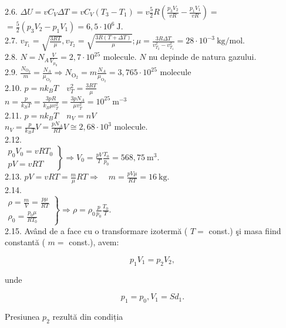 \documentclass[10pt]{article}
\begin{document}
2.6. $\Delta U=v C_{V} \Delta T=v C_{V}\left(T_{3}-T_{1}\right)=v \frac{5}{2} R\left(\frac{p_{3} V_{2}}{v R}-\frac{p_{1} V_{1}}{v R}\right)=$ $=\frac{5}{2}\left(p_{3} V_{2}-p_{1} V_{1}\right)=6,5 \cdot 10^{6} \mathrm{~J}$.\\
2.7. $v_{T_{1}}=\sqrt{\frac{3 R T}{\mu}}, v_{T_{2}}=\sqrt{\frac{3 R(T+\Delta T)}{\mu}} ; \mu=\frac{3 R \Delta T}{v_{T_{2}}^{2}-v_{T_{1}}^{2}}=28 \cdot 10^{-3} \mathrm{~kg} / \mathrm{mol}$.\\
2.8. $N=N_{A} \frac{V}{V_{\mu_{0}}}=2,7 \cdot 10^{25}$ molecule. $N$ nu depinde de natura gazului.\\
2.9. $\frac{N_{\mathrm{O}_{2}}}{m}=\frac{N_{A}}{\mu_{\mathrm{O}_{2}}} \Rightarrow N_{\mathrm{O}_{2}}=m \frac{N_{A}}{\mu_{\mathrm{O}_{2}}}=3,765 \cdot 10^{25}$ molecule\\
2.10. $p=n k_{B} T \quad v_{T}^{2}=\frac{3 R T}{\mu}$\\
$n=\frac{p}{k_{B} T}=\frac{3 p R}{k_{B} \mu v_{T}^{2}}=\frac{3 p N_{A}}{\mu v_{T}^{2}}=10^{25} \mathrm{~m}^{-3}$\\
2.11. $p=n k_{B} T \quad n_{V}=n V$\\
$n_{V}=\frac{p}{k_{B} T} V=\frac{p N_{A}}{R T} V \cong 2,68 \cdot 10^{3}$ molecule.\\
2.12.\\
$\left.\begin{array}{l}p_{0} V_{0}=v R T_{0} \\ p V=v R T\end{array}\right\} \Rightarrow V_{0}=\frac{p V}{T} \frac{T_{0}}{p_{0}}=568,75 \mathrm{~m}^{3}$.\\
2.13. $p V=v R T=\frac{m}{\mu} R T \Rightarrow \quad m=\frac{p V \mu}{R T}=16 \mathrm{~kg}$.\\
2.14.\\
$\left.\begin{array}{l}\rho=\frac{m}{V}=\frac{p \mu}{R T} \\ \rho_{0}=\frac{p_{0} \mu}{R T_{0}}\end{array}\right\} \Rightarrow \rho=\rho_{0} \frac{p}{p_{0}} \frac{T_{0}}{T}$.\\
2.15. Având de a face cu o transformare izotermă ( $T=$ const.) şi masa fiind constantă ( $m=$ const.), avem:

$$
p_{1} V_{1}=p_{2} V_{2},
$$

unde

$$
p_{1}=p_{0}, V_{1}=S d_{1} .
$$

Presiunea $p_{2}$ rezultă din condiția
\end{document}
